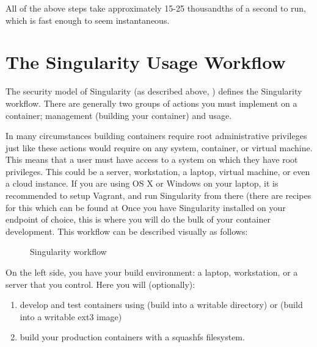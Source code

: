 \documentclass[letterpaper,10pt,english]{sphinxmanual}
\begin{document}
All of the above steps take approximately 15-25 thousandths of a second
to run, which is fast enough to seem instantaneous.


\section{The Singularity Usage Workflow}
\label{\detokenize{introduction:the-singularity-usage-workflow}}
The security model of Singularity (as described above, ) defines the
Singularity workflow. There are generally two groups of actions you
must implement on a container; management (building your container)
and usage.

In many circumstances building containers require root administrative
privileges just like these actions would require on any system,
container, or virtual machine. This means that a user must have access
to a system on which they have root privileges. This could be a
server, workstation, a laptop, virtual machine, or even a cloud
instance. If you are using OS X or Windows on your laptop, it is
recommended to setup Vagrant, and run Singularity from there (there
are recipes for this which can be found at Once you have Singularity
installed on your endpoint of choice, this is where you will do the
bulk of your container development. This workflow can be described
visually as follows:

\begin{figure}[htbp]
\centering
\capstart

\noindent{}
\caption{Singularity workflow}\label{\detokenize{introduction:id2}}\end{figure}

On the left side, you have your build environment: a laptop,
workstation, or a server that you control. Here you will (optionally):
\begin{enumerate}
\item {} 
develop and test containers using  (build into a writable directory)
or  (build into a writable ext3 image)

\item {} 
build your production containers with a squashfs filesystem.

\end{enumerate}
\end{document}

